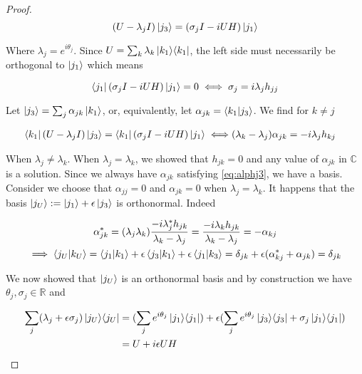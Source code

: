 \documentclass{article}
\newcommand{\R}{\mathbb{R}}
\newcommand{\C}{\mathbb{C}}
\newcommand{\e}{\epsilon}
\newcommand\ketbra[2]{\ket{#1}\!\bra{#2}}
\begin{document}
\begin{proof}
\begin{equation}
 (U - \lambda_j I) \ket{j_3} = (\sigma_j I - iUH) \ket{j_1}
\end{equation}

Where $\lambda_j = e^{i\theta_j}$. Since $U = \sum_{k} \lambda_k \ketbra{k_1}{k_1}$, the left side must necessarily be orthogonal to $\ket{j_1}$ which means

\begin{equation}
 \bra{j_1} (\sigma_j I - iUH) \ket{j_1} = 0
 \iff \sigma_j = i \lambda_j h_{jj} \\
\end{equation}

Let $\ket{j_3} = \sum_j \alpha_{jk} \ket{k_1}$, or, equivalently, let $\alpha_{jk} = \braket{k_1|j_3}$. We find for $k \neq j$

\begin{equation}\label{eq:alphj3}
\begin{split}
 \bra{k_1} (U - \lambda_j I) \ket{j_3} = \bra{k_1} (\sigma_j I - iUH) \ket{j_1}
 \iff& (\lambda_k - \lambda_j) \alpha_{jk} = - i \lambda_j h_{kj}
\end{split}
\end{equation}

When $\lambda_j \neq \lambda_k$. When $\lambda_j = \lambda_k$, we showed that $h_{jk} = 0$ and any value of $\alpha_{jk}$ in $\C$ is a solution. Since we always have $\alpha_{jk}$ satisfying \ref{eq:alphj3}, we have a basis. Consider we choose that $\alpha_{jj} = 0$ and $\alpha_{jk} = 0$ when $\lambda_j = \lambda_k$. It happens that the basis $\ket{j_U} := \ket{j_1} + \e \ket{j_3}$ is orthonormal. Indeed

\begin{gather*}
\alpha_{jk}^* = (\lambda_j \lambda_k) \frac{-i\lambda_j^* h_{jk}}{\lambda_k - \lambda_j} = \frac{-i\lambda_k h_{jk}}{\lambda_k - \lambda_j} = -\alpha_{kj}\\
\implies \braket{j_U|k_U} = \braket{j_1|k_1} + \e \braket{j_3|k_1} + \e \braket{j_1|k_3} = \delta_{jk} + \e (\alpha_{kj}^* + \alpha_{jk}) = \delta_{jk}
\end{gather*}

We now showed that $\ket{j_U}$ is an orthonormal basis and by construction we have $\theta_j, \sigma_j \in \R$ and

\begin{equation}
\begin{split}
\sum_j (\lambda_j + \e \sigma_j) \ketbra{j_U}{j_U} &= (\sum_j e^{i\theta_j} \ketbra{j_1}{j_1}) + \e (\sum_j e^{i\theta_j} \ketbra{j_3}{j_3} + \sigma_j \ketbra{j_1}{j_1})\\
                                                   &= U + i \e UH
\end{split}
\end{equation}
\end{proof}
\end{document}
